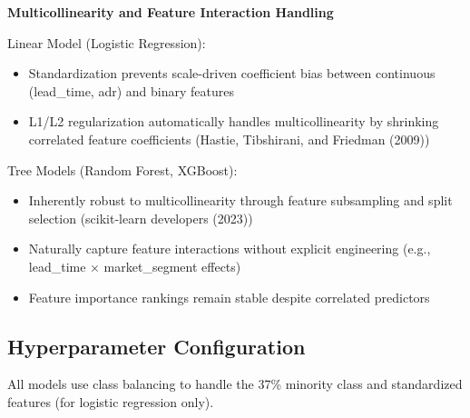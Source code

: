 \documentclass[
  letterpaper,
  DIV=11,
  numbers=noendperiod]{scrartcl}
\providecommand{\tightlist}{%
  \setlength{\itemsep}{0pt}\setlength{\parskip}{0pt}}
\begin{document}
\textbf{Multicollinearity and Feature Interaction Handling}

Linear Model (Logistic Regression):

\begin{itemize}
\tightlist
\item
  Standardization prevents scale-driven coefficient bias between
  continuous (lead\_time, adr) and binary features
\item
  L1/L2 regularization automatically handles multicollinearity by
  shrinking correlated feature coefficients (Hastie, Tibshirani, and
  Friedman (2009))
\end{itemize}

Tree Models (Random Forest, XGBoost):

\begin{itemize}
\tightlist
\item
  Inherently robust to multicollinearity through feature subsampling and
  split selection (scikit-learn developers (2023))
\item
  Naturally capture feature interactions without explicit engineering
  (e.g., lead\_time × market\_segment effects)
\item
  Feature importance rankings remain stable despite correlated
  predictors
\end{itemize}

\subsection{Hyperparameter
Configuration}\label{hyperparameter-configuration}

All models use class balancing to handle the 37\% minority class and
standardized features (for logistic regression only).
\end{document}
